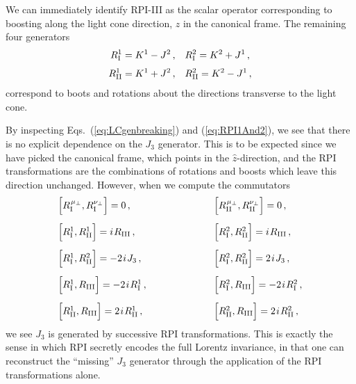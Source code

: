 \documentclass[12pt,document,nofootinbib,superscriptaddress,onecolumn,preprintnumbers,balancelastpage]{article}
\newcommand{\s}{\hspace{0.8pt}}
\DeclareRobustCommand{\Eqs}[2]{Eqs.~(\ref{#1}) and (\ref{#2})}
\begin{document}
\begin{spacing}{1.2}
We can immediately identify RPI-III as the scalar operator corresponding to boosting along the light cone direction, $\hat{z}$ in the canonical frame.
%
The remaining four generators 
%
\begin{align}
R_{\rm I}^{1} = K^1- J^2 \, ,
& \quad R_{\rm I}^{2} = K^2 + J^1\,,\notag \\[3pt] 
R_{\rm II}^{1}  = K^1 + J^2 \, ,&\quad
R_{\rm II}^{2} = K^2 - J^1 \,,
\label{eq:RPI1And2}
\end{align}
%
correspond to boots and rotations about the directions transverse to the light cone.  



By inspecting \Eqs{eq:LCgenbreaking}{eq:RPI1And2}, we see that there is no explicit dependence on the $J_3$ generator.  
%
This is to be expected since we have picked the canonical frame, which points in the $\hat{z}$-direction, and the RPI transformations are the combinations of rotations and boosts which leave this direction unchanged.
%
However, when we compute the commutators
\begin{align}
\begin{array}{ll}
  \Big[ R^{\s\mu_\perp}_{\rm I}, R^{\nu_\perp}_{\rm I} \Big] = 0\,, &\qquad\qquad\qquad   \Big[ R^{\s\mu_\perp}_{\rm II}, R^{\nu_\perp}_{\rm II} \Big] = 0\,, \\[12pt]
 \Big[ R_{\rm I}^1, R_{\rm II}^1 \Big] =  i\s R_{\rm III}\,, &\qquad\qquad\qquad  \Big[ R_{\rm I}^2, R_{\rm II}^2 \Big] = i\s R_{\rm III}\,, \\[12pt]
  \Big[ R_{\rm I}^1, R_{\rm II}^2 \Big] =  -2\s i \s J_3\,, &\qquad\qquad\qquad  \Big[ R_{\rm I}^2, R_{\rm II}^2 \Big] = 2\s i\s J_3\,, \\[12pt]
  \Big[ R_{\rm I}^1, R_{\rm III} \Big] = -2\s i\s R_{\rm I}^1\,, &\qquad\qquad\qquad  \Big[ R_{\rm I}^2, R_{\rm III} \Big] = -2\s i\s R_{\rm I}^2\,, \\[12pt]
    \Big[ R_{\rm II}^1, R_{\rm III} \Big] = 2\s i\s R_{\rm II}^1\,, &\qquad\qquad\qquad  \Big[ R_{\rm II}^2, R_{\rm III} \Big] = 2\s i\s R_{\rm II}^2 \,,
\end{array}
  \label{eq:RPIComm}
\end{align}
we see $J_3$ is generated by successive RPI transformations.  
%
This is exactly the sense in which RPI secretly encodes the full Lorentz invariance, in that one can reconstruct the ``missing'' $J_3$ generator through the application of the RPI transformations alone.


\end{spacing}
\end{document}
